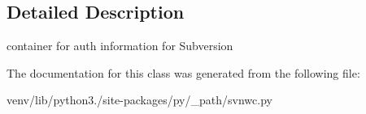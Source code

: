 \subsection{Detailed Description}
\begin{DoxyVerb}container for auth information for Subversion \end{DoxyVerb}
 

The documentation for this class was generated from the following file\+:\begin{DoxyCompactItemize}
\item 
venv/lib/python3./site-\/packages/py/\+\_\+path/svnwc.\+py\end{DoxyCompactItemize}
